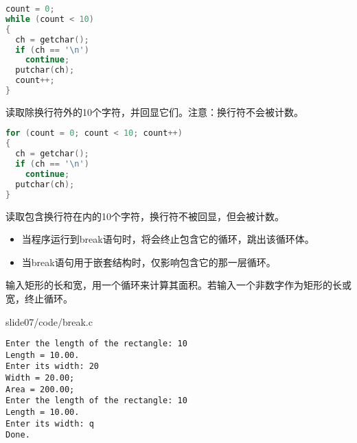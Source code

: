\begin{frame}[fragile]
\begin{lstlisting}[language=c,frame=single]
count = 0;
while (count < 10)
{
  ch = getchar();
  if (ch == '\n')
    continue;
  putchar(ch);
  count++;
}
\end{lstlisting}
读取除换行符外的10个字符，并回显它们。注意：换行符不会被计数。
\end{frame}

\begin{frame}[fragile]
\begin{lstlisting}[language=c,frame=single]
for (count = 0; count < 10; count++)
{
  ch = getchar();
  if (ch == '\n')
    continue;
  putchar(ch);
}
\end{lstlisting}
读取包含换行符在内的10个字符，换行符不被回显，但会被计数。
\end{frame}

\begin{frame}[fragile]
\begin{itemize}
\item
当程序运行到break语句时，将会终止包含它的循环，跳出该循环体。\\[0.1in]
\item
当break语句用于嵌套结构时，仅影响包含它的那一层循环。
\end{itemize}
\end{frame}

\begin{frame}[fragile]
\begin{li}
输入矩形的长和宽，用一个循环来计算其面积。若输入一个非数字作为矩形的长或宽，终止循环。
\end{li}
\end{frame}

\begin{frame}


            {slide07/code/break.c}
\end{frame}


\begin{frame}[fragile]
\begin{lstlisting}[backgroundcolor=\color{red!10}]
Enter the length of the rectangle: 10
Length = 10.00.
Enter its width: 20
Width = 20.00;
Area = 200.00; 
Enter the length of the rectangle: 10
Length = 10.00.
Enter its width: q
Done.
\end{lstlisting}
\end{frame}

